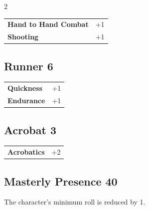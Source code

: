 \begin{multicols}{2}
\begin{tcolorbox}
\begin{tabular}{@{}ll@{}}
    \textbf{Hand to Hand Combat} & +1\\
    \textbf{Shooting} & +1\\
\end{tabular}


\end{tcolorbox}

\begin{tcolorbox}
    \subsection*{Runner \hfill \small{6 }}
    \tcblower




\begin{tabular}{@{}ll@{}}
    \textbf{Quickness} & +1\\
    \textbf{Endurance} & +1\\
\end{tabular}


\end{tcolorbox}

\begin{tcolorbox}
    \subsection*{Acrobat \hfill \small{3 }}
    \tcblower




\begin{tabular}{@{}ll@{}}
    \textbf{Acrobatics} & +2\\
\end{tabular}


\end{tcolorbox}

\begin{tcolorbox}
    \subsection*{Masterly Presence \hfill \small{40 }}
    \tcblower
The character's minimum roll is reduced by 1.


\end{tcolorbox}
\end{multicols}
